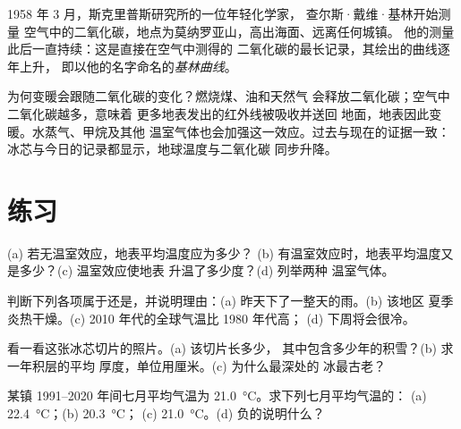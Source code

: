 \begin{history}[基林曲线]
1958 年 3 月，斯克里普斯研究所的一位年轻化学家，
查尔斯·戴维·基林开始测量
空气中的二氧化碳，地点为莫纳罗亚山，高出海面、远离任何城镇。
他的测量此后一直持续：这是直接在空气中测得的
二氧化碳的最长记录，其绘出的曲线逐年上升，
即以他的名字命名的\emph{基林曲线}。
\end{history}

为何变暖会跟随二氧化碳的变化？燃烧煤、油和天然气
会释放二氧化碳；空气中二氧化碳越多，意味着
更多地表发出的红外线被吸收并送回
地面，地表因此变暖。水蒸气、甲烷及其他
温室气体也会加强这一效应。过去与现在的证据一致：
冰芯与今日的记录都显示，地球温度与二氧化碳
同步升降。

\section{练习}

\begin{exercise}[$\star$]\label{exo:g9:climate-past-and-present:1}
(a) 若无温室效应，地表平均温度应为多少？
(b) 有温室效应时，地表平均温度又是多少？(c) 温室效应使地表
升温了多少度？(d) 列举两种
温室气体。
\end{exercise}

\begin{exercise}[$\star$]\label{exo:g9:climate-past-and-present:2}
判断下列各项属于还是，并说明理由：(a) 昨天下了一整天的雨。(b) 该地区
夏季炎热干燥。(c) 2010 年代的全球气温比 1980 年代高；
(d) 下周将会很冷。
\end{exercise}

\begin{exercise}[$\star$]\label{exo:g9:climate-past-and-present:3}
看一看这张冰芯切片的照片。(a) 该切片长多少，
其中包含多少年的积雪？(b) 求一年积层的平均
厚度，单位用厘米。(c) 为什么最深处的
冰最古老？
\end{exercise}

\begin{exercise}[$\star$]\label{exo:g9:climate-past-and-present:4}
某镇 1991--2020 年间七月平均气温为
\qty{21.0}{\degreeCelsius}。求下列七月平均气温的：
(a) \qty{22.4}{\degreeCelsius}；(b) \qty{20.3}{\degreeCelsius}；
(c) \qty{21.0}{\degreeCelsius}。(d) 负的说明什么？
\end{exercise}

